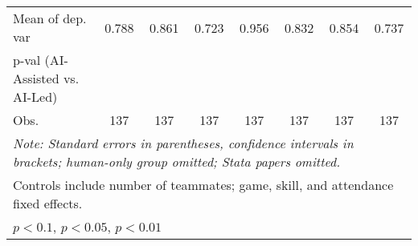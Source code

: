 \begin{tabular}{l*{7}{c}}
Mean of dep. var    &    0.788   &    0.861   &    0.723   &    0.956   &    0.832   &    0.854   &    0.737   \\
p-val (AI-Assisted vs. AI-Led)&   &   &   &   &   &   &   \\
Obs.                &137   &137   &137   &137   &137   &137   &137   \\
\hline
\hline\hline
\multicolumn{8}{l}{\it{Note:} Standard errors in parentheses, confidence intervals in brackets; human-only group omitted; Stata papers omitted.}\\
\multicolumn{8}{l}{Controls include number of teammates; game, skill, and attendance fixed effects.}\\
\multicolumn{8}{l}{\sym{*} \(p<0.1\), \sym{**} \(p<0.05\), \sym{***} \(p<0.01\)}\\
\end{tabular}
